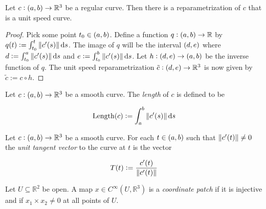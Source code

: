 \vspace{1mm}

\begin{proposition}
	Let $c: \intoo{a,b} \to \mathbb{R}^3$ be a regular curve. Then there is a reparametrization of $c$ that is a unit speed curve.
\end{proposition}

\begin{proof}
	Pick some point $t_0 \in \intoo{a,b}$. Define a function $q: \intoo{a,b} \to \mathbb{R}$ by $q(t) := \int_{t_0}^t \norm[0]{c'(s)} \d s$. The image of $q$ will be the interval $\intoo{d,e}$ where $d := \int_{t_0}^a \norm[0]{c'(s)}\d s$ and $e := \int_{t_0}^b \norm[0]{c'(s)}\d s$. Let $h: \intoo{d,e}\to\intoo{a,b}$ be the inverse function of $q$. The unit speed reparametrization $\tilde{c}: \intoo{d,e}\to \mathbb{R}^3$ is now given by $\tilde{c} := c \circ h$.
\end{proof}

\vspace{1mm}

\begin{definition}
	Let $c: \intoo{a,b} \to \mathbb{R}^3$ be a smooth curve. The \emph{length} of $c$ is defined to be

	\begin{equation}
		\Length(c) := \int_{a}^b \norm[0]{c'(s)} \d s
	\end{equation}
\end{definition}

\vspace{1mm}

\begin{definition}
	Let $c: \intoo{a,b} \to \mathbb{R}^3$ be a smooth curve. For each $t \in \intoo{a,b}$ such that $\norm[0]{c'(t)} \neq 0$ the \emph{unit tangent vector} to the curve at $t$ is the vector 

	\begin{equation}
		T(t) := \frac{c'(t)}{\norm[0]{c'(t)}}
	\end{equation}
\end{definition}

\vspace{1mm}

\begin{definition}
	Let $U \subseteq \mathbb{R}^2$ be open. A map $x \in C^\infty(U, \mathbb{R}^3)$ is a \emph{coordinate patch} if it is injective and if $x_1 \times x_2 \neq 0$ at all points of $U$. 
\end{definition}

